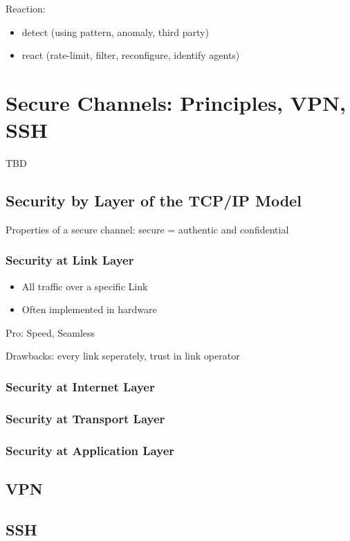 \documentclass[fs, footer]{latex4ei}
\begin{document}
\begin{multicols*}{4}
Reaction:
\begin{itemize}
	\item detect (using pattern, anomaly, third party)
	\item react (rate-limit, filter, reconfigure, identify agents)
\end{itemize}

\section{Secure Channels: Principles, VPN, SSH}
TBD
\subsection{Security by Layer of the TCP/IP Model}
Properties of a secure channel: secure = authentic and confidential

\subsubsection{Security at Link Layer}
\begin{itemize}
	\item All traffic over a specific Link
	\item Often implemented in hardware
\end{itemize}

Pro: Speed, Seamless

Drawbacks: every link seperately, trust in link operator

\subsubsection{Security at Internet Layer}

\subsubsection{Security at Transport Layer}

\subsubsection{Security at Application Layer}

\subsection{VPN}

\subsection{SSH}


\end{multicols*}
\end{document}
